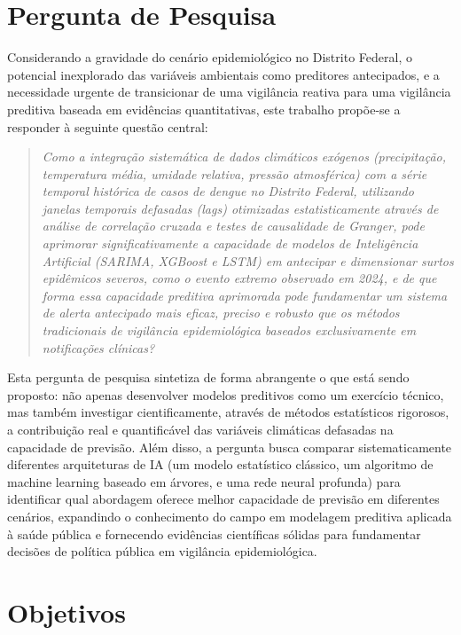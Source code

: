 \section{Pergunta de Pesquisa}

Considerando a gravidade do cenário epidemiológico no Distrito Federal, o potencial inexplorado das variáveis ambientais como preditores antecipados, e a necessidade urgente de transicionar de uma vigilância reativa para uma vigilância preditiva baseada em evidências quantitativas, este trabalho propõe-se a responder à seguinte questão central:

\begin{quote}
\textit{Como a integração sistemática de dados climáticos exógenos (precipitação, temperatura média, umidade relativa, pressão atmosférica) com a série temporal histórica de casos de dengue no Distrito Federal, utilizando janelas temporais defasadas (\textit{lags}) otimizadas estatisticamente através de análise de correlação cruzada e testes de causalidade de Granger, pode aprimorar significativamente a capacidade de modelos de Inteligência Artificial (SARIMA, XGBoost e LSTM) em antecipar e dimensionar surtos epidêmicos severos, como o evento extremo observado em 2024, e de que forma essa capacidade preditiva aprimorada pode fundamentar um sistema de alerta antecipado mais eficaz, preciso e robusto que os métodos tradicionais de vigilância epidemiológica baseados exclusivamente em notificações clínicas?}
\end{quote}

Esta pergunta de pesquisa sintetiza de forma abrangente o que está sendo proposto: não apenas desenvolver modelos preditivos como um exercício técnico, mas também investigar cientificamente, através de métodos estatísticos rigorosos, a contribuição real e quantificável das variáveis climáticas defasadas na capacidade de previsão. Além disso, a pergunta busca comparar sistematicamente diferentes arquiteturas de IA (um modelo estatístico clássico, um algoritmo de machine learning baseado em árvores, e uma rede neural profunda) para identificar qual abordagem oferece melhor capacidade de previsão em diferentes cenários, expandindo o conhecimento do campo em modelagem preditiva aplicada à saúde pública e fornecendo evidências científicas sólidas para fundamentar decisões de política pública em vigilância epidemiológica.

\section{Objetivos}

